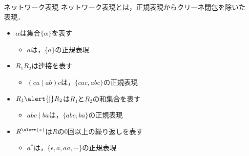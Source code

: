 \documentclass[dvipdfmx,beamer]{standalone}
\begin{document}
\begin{frame}{ネットワーク表現}
	ネットワーク表現とは，正規表現からクリーネ閉包を除いた表現．
	\begin{itemize}
		\item $\alpha$は集合$\{\alpha\}$を表す
			\begin{itemize}
				\item $a$は，$\{a\}$の正規表現
			\end{itemize}
		\item $R_1R_2$は連接を表す
			\begin{itemize}
				\item $(ca\mid ab)c$は，$\{cac, abc\}$の正規表現
			\end{itemize}
    \item $R_1\alert{|}R_2$は$R_1$と$R_2$の和集合を表す
			\begin{itemize}
				\item $abc\mid ba$は，$\{abc, ba\}$の正規表現
			\end{itemize}
    \item $R^{\alert{*}}$は$R$の$0$回以上の繰り返しを表す
			\begin{itemize}
				\item $a^*$は，$\{\epsilon, a, aa, \cdots\}$の正規表現
			\end{itemize}
	\end{itemize}
	
\end{frame}
\end{document}
